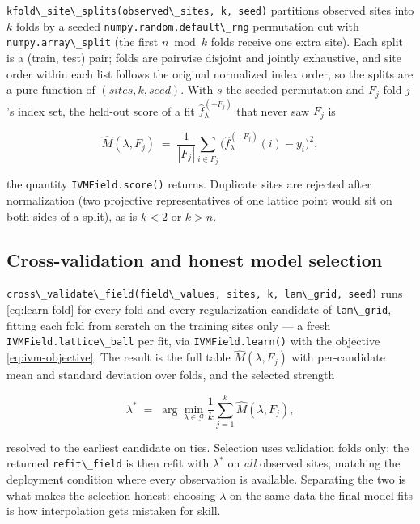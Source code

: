 \documentclass[
  10pt,
]{article}
\newcommand{\passthrough}[1]{#1}
\begin{document}
\passthrough{\lstinline!kfold\_site\_splits(observed\_sites, k, seed)!}
partitions observed sites into \(k\) folds by a seeded
\passthrough{\lstinline!numpy.random.default\_rng!} permutation cut with
\passthrough{\lstinline!numpy.array\_split!} (the first \(n \bmod k\)
folds receive one extra site). Each split is a (train, test) pair; folds
are pairwise disjoint and jointly exhaustive, and site order within each
list follows the original normalized index order, so the splits are a
pure function of \((sites, k, seed)\). With \(s\) the seeded permutation
and \(F_j\) fold \(j\)'s index set, the held-out score of a fit
\(\hat{f}^{(-F_j)}_\lambda\) that never saw \(F_j\) is

\begin{equation}
\label{eq:learn-fold}
\widehat{M}(\lambda, F_j) \;=\; \frac{1}{|F_j|}
\sum_{i \in F_j}
\bigl( \hat{f}^{(-F_j)}_\lambda(i) - y_i \bigr)^{2},
\end{equation}

the quantity \passthrough{\lstinline!IVMField.score()!} returns.
Duplicate sites are rejected after normalization (two projective
representatives of one lattice point would sit on both sides of a
split), as is \(k < 2\) or \(k > n\).

\subsection{Cross-validation and honest model
selection}\label{cross-validation-and-honest-model-selection}

\passthrough{\lstinline!cross\_validate\_field(field\_values, sites, k, lam\_grid, seed)!}
runs \eqref{eq:learn-fold} for every fold and every regularization
candidate of \passthrough{\lstinline!lam\_grid!}, fitting each fold from
scratch on the training sites only --- a fresh
\passthrough{\lstinline!IVMField.lattice\_ball!} per fit, via
\passthrough{\lstinline!IVMField.learn()!} with the objective
\eqref{eq:ivm-objective}. The result is the full table
\(\widehat{M}(\lambda, F_j)\) with per-candidate mean and standard
deviation over folds, and the selected strength

\begin{equation}
\label{eq:learn-lambda-star}
\lambda^{*} \;=\; \arg\min_{\lambda \in \mathcal{G}}
\frac{1}{k} \sum_{j=1}^{k} \widehat{M}(\lambda, F_j),
\end{equation}

resolved to the earliest candidate on ties. Selection uses validation
folds only; the returned \passthrough{\lstinline!refit\_field!} is then
refit with \(\lambda^{*}\) on \emph{all} observed sites, matching the
deployment condition where every observation is available. Separating
the two is what makes the selection honest: choosing \(\lambda\) on the
same data the final model fits is how interpolation gets mistaken for
skill.
\end{document}
